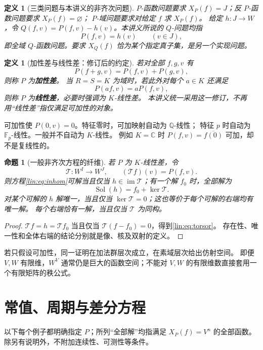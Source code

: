 \documentclass[11pt,a4paper,oneside,openany]{book}
\theoremstyle{lecture}
\newtheorem{proposition}[theorem]{命题}
\newtheorem{definition}[theorem]{定义}
\newcommand{\Q}{\mathbb Q}
\newcommand{\C}{\mathbb C}
\newcommand{\im}{\operatorname{im}}
\newcommand{\T}{\mathcal T}
\newcommand{\Sol}{\operatorname{Sol}}
\numberwithin{equation}{section}
\begin{document}
\begin{definition}[三类问题与本讲义的非齐次问题]
$P$-函数问题要求 $X_P(f)=J$；反 $P$-函数问题要求 $X_P(f)=\varnothing$；
$P$-域问题要求对给定 $f$ 求 $X_P(f)$。
给定 $h:J\to W$，令 $Q(f,v)=P(f,v)-h(v)$。本讲义所说的 $Q$-问题均指
\begin{equation}\label{lin:eq:inhom}
 P(f,v)=h(v)\qquad(v\in J),
\end{equation}
即全域 $Q$-函数问题。要求 $X_Q(f)$ 恰为某个指定真子集，是另一个实现问题。
\end{definition}

\begin{definition}[加性差与线性差：修订后的约定]
若对全部 $f,g,v$ 有
\[
 P(f+g,v)=P(f,v)+P(g,v),
\]
则称 $P$ 为\textbf{加性差}。
当 $R=S=K$ 为域时，若此外对每个 $a\in K$ 还满足
\[
 P(af,v)=aP(f,v),
\]
则称 $P$ 为\textbf{线性差}，必要时强调为 $K$-线性差。
本讲义统一采用这一修订，不再用“线性差”指仅满足可加性的对象。
\end{definition}
可加性使 $P(0,v)=0$。特征零时，可加映射自动为 $\Q$-线性；
特征 $p$ 时自动为 $\mathbb F_p$-线性。一般并不自动为 $K$-线性。
例如 $K=\C$ 时 $P(f,v)=\overline{f(0)}$ 可加，却不是复线性的。

\begin{proposition}[一般非齐次方程的纤维]
若 $P$ 为 $K$-线性差，令
\[
 \T:W^I\to W^J,\qquad (\T f)(v)=P(f,v).
\]
则方程\eqref{lin:eq:inhom}可解当且仅当 $h\in\im\T$；有一个解 $f_0$ 时，全部解为
\begin{equation}\label{lin:eq:torsor}
 \Sol(h)=f_0+\ker\T.
\end{equation}
对某个可解的 $h$ 解唯一，当且仅当 $\ker\T=0$；这也等价于每个可解的右端均有唯一解。
每个右端恰有一解，当且仅当 $\T$ 为同构。
\end{proposition}
\begin{proof}
$\T f=h=\T f_0$ 当且仅当 $\T(f-f_0)=0$，得到\eqref{lin:eq:torsor}。
存在性、唯一性和全体右端的结论分别就是像、核及双射的定义。
\end{proof}
若只假设可加性，同一证明在加法群层次成立，在素域层次给出仿射空间。
即便 $V,W$ 有限维，$W^V$ 通常仍是巨大的函数空间；不能对 $V,W$ 的有限维数直接套用一个有限矩阵的秩公式。

\section{常值、周期与差分方程}
以下每个例子都明确指定 $P$；所列“全部解”均指满足 $X_P(f)=V^n$ 的全部函数。除另有说明外，不附加连续性、可测性等条件。
\end{document}
